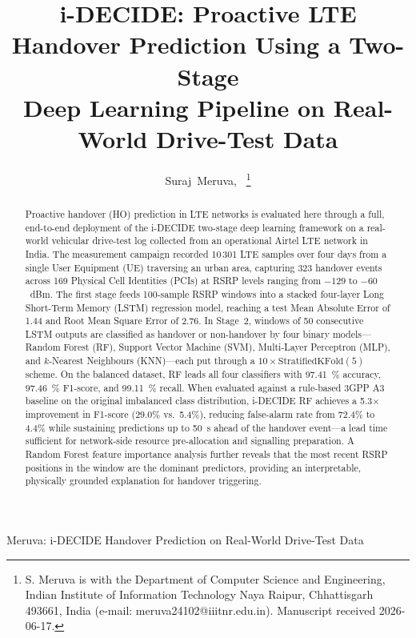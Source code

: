 \documentclass[journal]{IEEEtran}
\begin{document}
\title{i-DECIDE: Proactive LTE Handover Prediction Using a Two-Stage\\
Deep Learning Pipeline on Real-World Drive-Test Data}

\author{Suraj~Meruva,~%
\thanks{S. Meruva is with the Department of Computer Science and
Engineering, Indian Institute of Information Technology Naya Raipur,
Chhattisgarh 493661, India (e-mail: meruva24102@iiitnr.edu.in).
Manuscript received 2026-06-17.}}

%
{Meruva: i-DECIDE Handover Prediction on Real-World Drive-Test Data}

\maketitle

\begin{abstract}
Proactive handover (HO) prediction in LTE networks is evaluated here
through a full, end-to-end deployment of the i-DECIDE two-stage deep
learning framework on a real-world vehicular drive-test log collected
from an operational Airtel LTE network in India. The measurement
campaign recorded 10\,301 LTE samples over four days from a single
User Equipment (UE) traversing an urban area, capturing 323 handover
events across 169 Physical Cell Identities (PCIs) at RSRP levels
ranging from $-129$ to $-60$~dBm. The first stage feeds 100-sample
RSRP windows into a stacked four-layer Long Short-Term Memory (LSTM)
regression model, reaching a test Mean Absolute Error of
\SI{1.44}{\dBm} and Root Mean Square Error of \SI{2.76}{\dBm}. In
Stage~2, windows of 50 consecutive LSTM outputs are classified as
handover or non-handover by four binary models---Random Forest (RF),
Support Vector Machine (SVM), Multi-Layer Perceptron (MLP), and
$k$-Nearest Neighbours (KNN)---each put through a $10\times
\text{StratifiedKFold}(5)$ scheme. On the balanced dataset, RF leads
all four classifiers with \SI{97.41}{\percent} accuracy,
\SI{97.46}{\percent} F1-score, and \SI{99.11}{\percent} recall.
When evaluated against a rule-based 3GPP A3 baseline on the original
imbalanced class distribution, i-DECIDE RF achieves a 5.3$\times$
improvement in F1-score (29.0\% vs.\ 5.4\%), reducing false-alarm
rate from 72.4\% to 4.4\% while sustaining predictions up to
\SI{50}{\second} ahead of the handover event---a lead time sufficient
for network-side resource pre-allocation and signalling preparation.
A Random Forest feature importance analysis further reveals that the
most recent RSRP positions in the window are the dominant predictors,
providing an interpretable, physically grounded explanation for
handover triggering.
\end{abstract}
\end{document}
